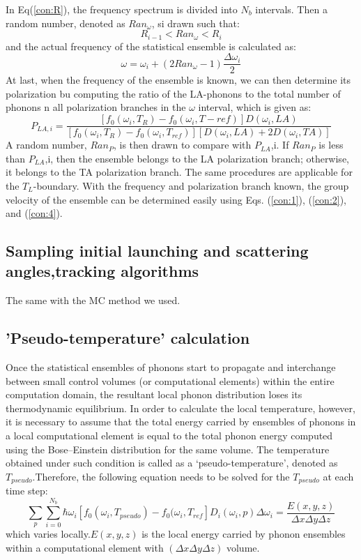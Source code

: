 In Eq(\ref{con:R}), the frequency spectrum is divided into $N_b$ intervals. Then a random number, denoted as $Ran_{\omega}$, si drawn such that:
\begin{equation}
R_{i-1} < Ran_{\omega} < R_i
\end{equation}
and the actual frequency of the statistical ensemble is calculated as:
\begin{equation}
\omega = \omega_i + (2 Ran_{\omega} - 1) \frac{\Delta \omega_i}{2}
\end{equation}
At last, when the frequency of the ensemble is known, we can then determine its polarization bu computing the ratio of the LA-phonons to the total number of phonons n all polarization branches in the $\omega$ interval, which is given as:
\begin{equation}
P_{LA,i}=\frac{[f_0(\omega_i,T_R)-f_0(\omega_i,T-{ref})]D(\omega_i,LA)}{[f_0(\omega_i,T_R)-f_0(\omega_i,T_{ref})][D(\omega_i,LA)+2D(\omega_i,TA)]}
\end{equation}
A random number, $Ran_P$, is then drawn to compare with $P_{LA}$,i. If $Ran_P$
is less than $P_{LA}$,i, then the ensemble belongs to the LA polarization
branch; otherwise, it belongs to the TA polarization branch. The
same procedures are applicable for the $T_L$-boundary. With the frequency
and polarization branch known, the group velocity of the
ensemble can be determined easily using Eqs. (\ref{con:1}), (\ref{con:2}), and (\ref{con:4}).

\subsection*{Sampling initial launching and scattering angles,tracking algorithms}
The same with the MC method we used.
\subsection*{'Pseudo-temperature' calculation}
Once the statistical ensembles of phonons start to propagate
and interchange between small control volumes (or computational
elements) within the entire computation domain, the resultant local
phonon distribution loses its thermodynamic equilibrium. In
order to calculate the local temperature, however, it is necessary
to assume that the total energy carried by ensembles of phonons
in a local computational element is equal to the total phonon energy
computed using the Bose–Einstein distribution for the same
volume. The temperature obtained under such condition is called
as a ‘pseudo-temperature’, denoted as $T_{pseudo}$.Therefore, the following
equation needs to be solved for the $T_{pseudo}$ at each time step:
\begin{equation}
\sum_p \sum_{i=0}^{N_b} \hbar \omega_i [f_0(\omega_i,T_{pseudo})-f_0(\omega_i,T_{ref}]D_i(\omega_i,p) \Delta \omega_i = \frac{E(x,y,z)}{\Delta x \Delta y \Delta z }
\end{equation}
which varies locally.$E(x,y,z)$ is the local energy carried by phonon ensembles within a computational element with $(\Delta x \Delta y \Delta z)$ volume.

